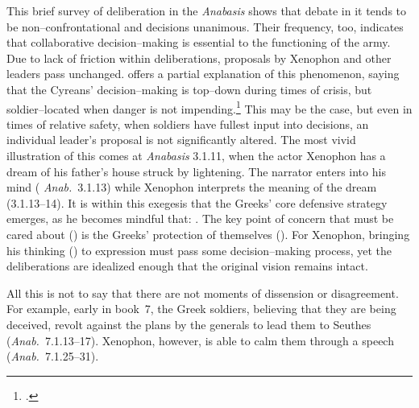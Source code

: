 \documentclass[12pt,letterpaper,oneside,final]{memoir}
\begin{document}
This brief survey of deliberation in the \emph{Anabasis} shows that debate in it tends to be non--confrontational and decisions unanimous. Their frequency, too, indicates that collaborative decision--making is essential to the functioning of the army. Due to lack of friction within deliberations, proposals by Xenophon and other leaders pass unchanged. \textcite{dillery1995} offers a partial explanation of this phenomenon, saying that the Cyreans' decision--making is top--down during times of crisis, but soldier--located when danger is not impending.\footnote{.} This may be the case, but even in times of relative safety, when soldiers have fullest input into decisions, an individual leader's proposal is not significantly altered. The most vivid illustration of this comes at \emph{Anabasis} 3.1.11, when the actor Xenophon has a dream of his father's house struck by lightening. The narrator enters into his mind (  \emph{Anab.}~3.1.13) while Xenophon interprets the meaning of the dream (3.1.13--14). It is within this exegesis that the Greeks' core defensive strategy emerges, as he becomes mindful that: . The key point of concern that must be cared about () is the Greeks' protection of themselves (). For Xenophon, bringing his thinking () to expression must pass some decision--making process, yet the deliberations are idealized enough that the original vision remains intact.

All this is not to say that there are not moments of dissension or disagreement. For example, early in book~7, the Greek soldiers, believing that they are being deceived, revolt against the plans by the generals to lead them to Seuthes (\emph{Anab.}~7.1.13--17). Xenophon, however, is able to calm them through a speech (\emph{Anab.}~7.1.25--31).
\end{document}
